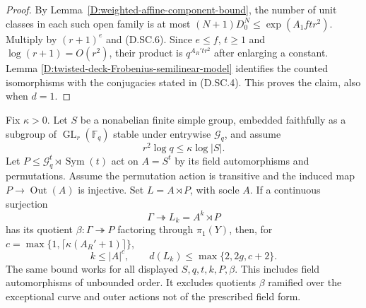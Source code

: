 \begin{proof}
By Lemma~\ref{D:weighted-affine-component-bound}, the
number of unit classes in each such open family is at
most $(N+1)D_0^N\leq\exp(A_1ftr^2)$. Multiply by
$(r+1)^e$ and (D.SC.6). Since $e\leq f$, $t\geq1$
and $\log(r+1)=O(r^2)$, their product is
$q^{A_R'tr^2}$ after enlarging a constant. Lemma
\ref{D:twisted-deck-Frobenius-semilinear-model} identifies
the counted isomorphisms with the conjugacies stated in
(D.SC.4). This proves the claim, also when $d=1$.
\end{proof}

\begin{theorem}
\label{D:unramified-field-permutation-crowns}
Fix $\kappa>0$. Let $S$ be a nonabelian finite simple
group, embedded faithfully as a subgroup of
$\operatorname{GL}_r(\mathbb F_q)$ stable under entrywise
$\mathcal G_q$, and assume
\[
                    r^2\log q\leq\kappa\log|S|.       \tag{D.SC.8}
\]
Let $P\leq\mathcal G_q^t\rtimes\operatorname{Sym}(t)$
act on $A=S^t$ by its field automorphisms and permutations.
Assume the permutation action is transitive and the
induced map $P\to\operatorname{Out}(A)$ is injective.
Set $L=A\rtimes P$, with socle $A$. If a continuous
surjection
\[
              \Gamma\twoheadrightarrow L_k=A^k\rtimes P
                                                        \tag{D.SC.9}
\]
has its quotient $\beta:\Gamma\twoheadrightarrow P$
factoring through $\pi_1(Y)$, then, for
$c=\max\{1,\lceil\kappa(A_R'+1)\rceil\}$,
\[
             k\leq|A|^c,
        \qquad d(L_k)\leq\max\{2,2g,c+2\}.            \tag{D.SC.10}
\]
The same bound works for all displayed $S,q,t,k,P,\beta$.
This includes field automorphisms of unbounded order.
It excludes quotients $\beta$ ramified over the exceptional
curve and outer actions not of the prescribed field form.
\end{theorem}

